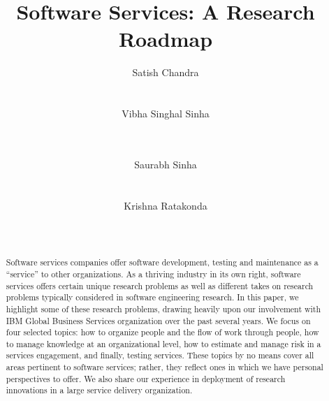 \documentclass{sig-alternate}
\begin{document}

\title{Software Services: A Research Roadmap}


\author{
\alignauthor Satish Chandra\\
       \\
       \\
\alignauthor Vibha Singhal Sinha\\
	\\
	\\
\and
\alignauthor Saurabh Sinha\\
	\\
	\\
\alignauthor Krishna Ratakonda\\
	\\
	\\
}

\maketitle

\begin{abstract}

Software services companies offer software development, testing and maintenance
as a ``service'' to other organizations.  As a thriving industry in its own
right, software services offers certain unique research problems as well as
different takes on research problems typically considered in software
engineering research. In this paper, we highlight some of these research
problems, drawing heavily upon our involvement with IBM Global Business Services
organization over the past several years.  We focus on four selected topics: how
to organize people and the flow of work through people, how to manage knowledge
at an organizational level, how to estimate and manage risk in a services
engagement, and finally, testing services. These topics by no means cover all
areas pertinent to software services; rather, they reflect ones in which we have
personal perspectives to offer.  We also share our experience in deployment of
research innovations in a large service delivery organization.

\end{abstract}
\end{document}
